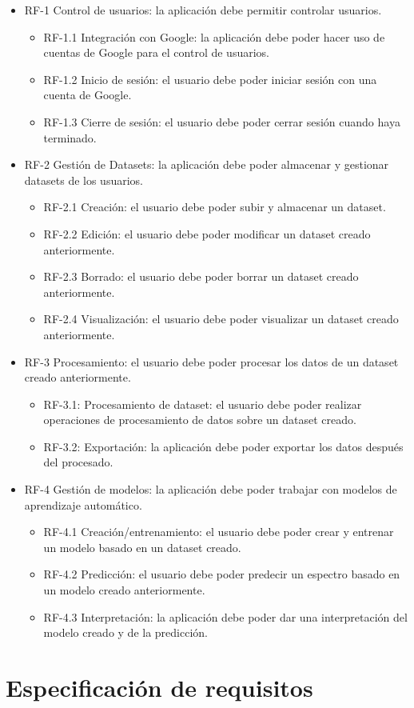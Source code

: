 \begin{itemize}
	\tightlist
	\item RF-1 Control de usuarios: la aplicación debe permitir controlar usuarios.
	\begin{itemize}
		\tightlist
		\item RF-1.1 Integración con Google: la aplicación debe poder hacer uso de
		cuentas de Google para el control de usuarios.
		\item RF-1.2 Inicio de sesión: el usuario debe poder iniciar sesión con una
		cuenta de Google.
		\item RF-1.3 Cierre de sesión: el usuario debe poder cerrar sesión cuando haya
		terminado.
	\end{itemize}
	\item RF-2 Gestión de Datasets: la aplicación debe poder almacenar y gestionar
	datasets de los usuarios.
	\begin{itemize}
		\tightlist
		\item RF-2.1 Creación: el usuario debe poder subir y almacenar un dataset.
		\item RF-2.2 Edición: el usuario debe poder modificar un dataset creado
		anteriormente.
		\item RF-2.3 Borrado: el usuario debe poder borrar un dataset creado
		anteriormente.
		\item RF-2.4 Visualización: el usuario debe poder visualizar un dataset creado
		anteriormente. 
	\end{itemize}
	\item RF-3 Procesamiento: el usuario debe poder procesar los datos de un
	dataset creado anteriormente.
	\begin{itemize}
		\tightlist
		\item RF-3.1: Procesamiento de dataset: el usuario debe poder realizar
		operaciones de procesamiento de datos sobre un dataset creado.
		\item RF-3.2: Exportación: la aplicación debe poder exportar los datos después
		del procesado.
	\end{itemize}
	\item RF-4 Gestión de modelos: la aplicación debe poder trabajar con modelos de
	aprendizaje automático.
	\begin{itemize}
		\tightlist
		\item RF-4.1 Creación/entrenamiento: el usuario debe poder crear y entrenar un
		modelo basado en un dataset creado.
		\item RF-4.2 Predicción: el usuario debe poder predecir un espectro basado en
		un modelo creado anteriormente.
		\item RF-4.3 Interpretación: la aplicación debe poder dar una interpretación
		del modelo creado y de la predicción.
	\end{itemize}
\end{itemize}
\section{Especificación de requisitos}



